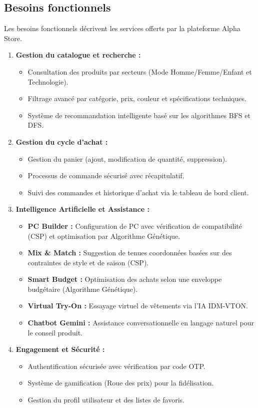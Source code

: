\subsection{Besoins fonctionnels}

Les besoins fonctionnels décrivent les services offerts par la plateforme Alpha Store.

\begin{enumerate}
    \item \textbf{Gestion du catalogue et recherche :}
        \begin{itemize}[label=$\bullet$]
            \item Consultation des produits par secteurs (Mode Homme/Femme/Enfant et Technologie).
            \item Filtrage avancé par catégorie, prix, couleur et spécifications techniques.
            \item Système de recommandation intelligente basé sur les algorithmes BFS et DFS.
        \end{itemize}
    \item \textbf{Gestion du cycle d'achat :}
        \begin{itemize}[label=$\bullet$]
            \item Gestion du panier (ajout, modification de quantité, suppression).
            \item Processus de commande sécurisé avec récapitulatif.
            \item Suivi des commandes et historique d'achat via le tableau de bord client.
        \end{itemize}
    \item \textbf{Intelligence Artificielle et Assistance :}
        \begin{itemize}[label=$\bullet$]
            \item \textbf{PC Builder :} Configuration de PC avec vérification de compatibilité (CSP) et optimisation par Algorithme Génétique.
            \item \textbf{Mix \& Match :} Suggestion de tenues coordonnées basées sur des contraintes de style et de saison (CSP).
            \item \textbf{Smart Budget :} Optimisation des achats selon une enveloppe budgétaire (Algorithme Génétique).
            \item \textbf{Virtual Try-On :} Essayage virtuel de vêtements via l'IA IDM-VTON.
            \item \textbf{Chatbot Gemini :} Assistance conversationnelle en langage naturel pour le conseil produit.
        \end{itemize}
    \item \textbf{Engagement et Sécurité :}
        \begin{itemize}[label=$\bullet$]
            \item Authentification sécurisée avec vérification par code OTP.
            \item Système de gamification (Roue des prix) pour la fidélisation.
            \item Gestion du profil utilisateur et des listes de favoris.
        \end{itemize}
\end{enumerate}

